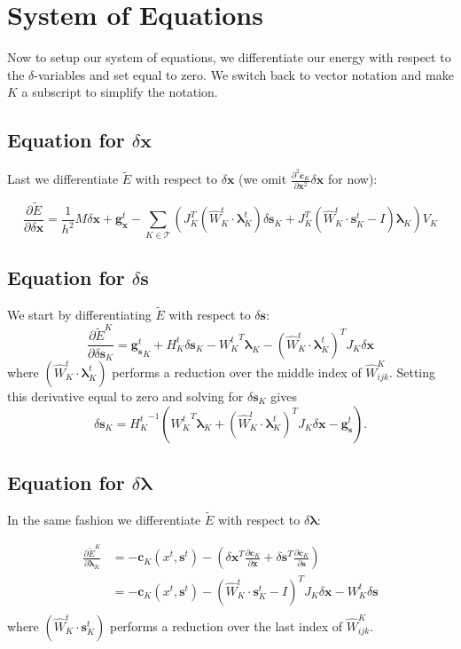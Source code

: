 \documentclass[letterpaper,12pt]{article}
\theoremstyle{remark}
\newcommand{\Th}{\mathcal{T}}
\newcommand{\x}{\mathbf{x}}
\newcommand{\C}{\mathbf{c}}
\newcommand{\s}{\mathbf{s}}
\newcommand{\la}{\mathbf{\lambda}}
\newcommand{\dx}{\delta \x}
\newcommand{\ds}{\delta \s}
\newcommand{\dl}{\delta \la}
\newcommand{\gx}{ {\mathbf{g}_\x^t} }
\newcommand{\gs}{ {\mathbf{g}_\s^t} }
\begin{document}
\section{System of Equations}
Now to setup our system of equations, we differentiate our energy with respect to the $\delta$-variables and set equal to zero. We switch back to vector notation and make $K$ a subscript to simplify the notation.


\subsection{Equation for $\dx$}
Last we differentiate $\tilde{E}$ with respect to $\dx$ (we omit $\frac{\partial^2 \C_K}{ \partial \x^2} \dx$ for now):

\begin{equation}
\frac{\partial \tilde{E}}{\partial \dx} = \frac{1}{h^2}M\dx + \gx 
- \sum_{K \in \Th} \left(
J_K^T(\hat{W}_K^{t}\cdot \la_K^t) \ds_K +
J_K^T(\hat{W}_K^{t}\cdot \s_K^t - I)\la_K
\right)V_K
\end{equation}


\subsection{Equation for $\ds$}
We start by differentiating $\tilde{E}$ with respect to $\ds$:
\begin{equation}
\frac{\partial \tilde{E}^K}{\partial \ds_K} =  \gs_K + H_K^t \ds_K -
{W_K^t}^T \la_K - (\hat{W}_K^{t}\cdot \la_K^t)^T J_K \dx
\end{equation}
where $(\hat{W}_K^{t}\cdot \la_K^t)$ performs a reduction over the middle index of $\hat{W}^K_{ijk}$. Setting this derivative equal to zero and solving for $\ds_K$ gives
\begin{equation}
\ds_K = {H_K^t}^{-1} \left( {W_K^t}^T \la_K + (\hat{W}_K^{t}\cdot \la_K^t)^T J_K \dx - \gs \right).
\end{equation}

\subsection{Equation for $\dl$}
In the same fashion we differentiate $\tilde{E}$ with respect to $\dl$:

\begin{equation}
\begin{split}
\frac{\partial \tilde{E}^K}{\partial \la_K} &= -\C_K (x^t,\s^t)- \left( \dx^T 
  \frac{\partial \C_K }{\partial \x} +  \ds^T \frac{\partial \C_K }{\partial \s} \right) \\
  &= -\C_K (x^t,\s^t) -(\hat{W}_K^{t}\cdot \s_K^t - I)^T J_K \dx - W_K^t \ds\\
\end{split}
\end{equation}
where $(\hat{W}_K^{t}\cdot \s_K^t)$ performs a reduction over the last index of $\hat{W}^K_{ijk}$.
\end{document}
